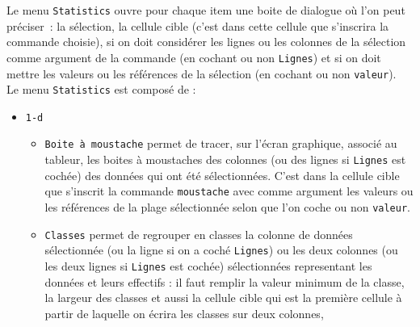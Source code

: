 \documentclass[a4paper,11pt]{article}
\begin{document}
Le menu {\tt Statistics} ouvre pour chaque item une boite de dialogue o\`u l'on
peut pr\'eciser~: la s\'election, la cellule cible (c'est dans cette cellule 
que s'inscrira la commande choisie), si on doit consid\'erer les lignes ou les 
colonnes de la  s\'election comme argument de la commande (en cochant ou non
{\tt Lignes}) et 
si on doit mettre les valeurs ou les r\'ef\'erences de la  s\'election 
(en cochant ou non {\tt valeur}).\\
Le menu {\tt Statistics} est compos\'e de :
\begin{itemize}
\item {\tt 1-d}
\begin{itemize}
\item {\tt Boite \`a moustache}   permet de tracer, 
sur l'\'ecran graphique,
associ\'e au tableur, les boites \`a moustaches des colonnes (ou des lignes si 
{\tt Lignes} est coch\'ee) des donn\'ees qui ont \'et\'e s\'electionn\'ees. C'est dans la 
cellule cible  que s'inscrit la commande {\tt moustache} avec comme argument
les valeurs ou les r\'ef\'erences de la plage s\'electionn\'ee  selon que 
l'on coche ou non {\tt valeur}.
\item {\tt Classes}  permet de regrouper en classes la colonne 
de donn\'ees s\'electionn\'ee (ou la ligne si on a  coch\'e {\tt Lignes})  
 ou les deux colonnes (ou les deux lignes si {\tt Lignes} est 
coch\'ee) s\'electionn\'ees representant les
 donn\'ees et leurs effectifs : il faut remplir la valeur minimum de la classe,
la largeur des classes et aussi la cellule cible qui est la premi\`ere cellule 
\`a partir de laquelle on \'ecrira les classes sur deux colonnes,


\end{itemize}
\end{itemize}
\end{document}
